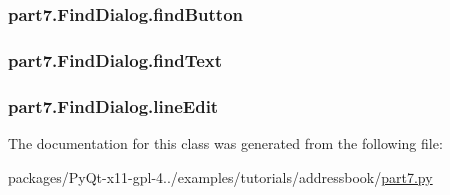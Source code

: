 \subsubsection[{find\+Button}]{\setlength{\rightskip}{0pt plus 5cm}part7.\+Find\+Dialog.\+find\+Button}\label{classpart7_1_1FindDialog_ad95a148888e590255ab56c3666465dbd}
\hypertarget{classpart7_1_1FindDialog_a0abf01d5e2d803baa5694d2c59af9f8c}{}
\subsubsection[{find\+Text}]{\setlength{\rightskip}{0pt plus 5cm}part7.\+Find\+Dialog.\+find\+Text}\label{classpart7_1_1FindDialog_a0abf01d5e2d803baa5694d2c59af9f8c}
\hypertarget{classpart7_1_1FindDialog_a0daeb7ec4020fb076853e44bda9fc0b8}{}
\subsubsection[{line\+Edit}]{\setlength{\rightskip}{0pt plus 5cm}part7.\+Find\+Dialog.\+line\+Edit}\label{classpart7_1_1FindDialog_a0daeb7ec4020fb076853e44bda9fc0b8}


The documentation for this class was generated from the following file\+:\begin{DoxyCompactItemize}
\item 
packages/\+Py\+Qt-\/x11-\/gpl-\/4../examples/tutorials/addressbook/\hyperlink{part7_8py}{part7.\+py}\end{DoxyCompactItemize}
